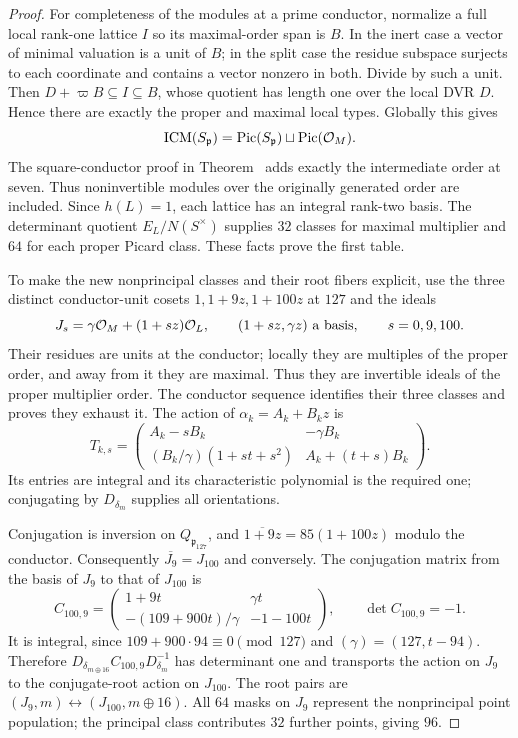 \begin{proof}
For completeness of the modules at a prime conductor, normalize a
full local rank-one lattice $I$ so its maximal-order span is $B$.
In the inert case a vector of minimal valuation is a unit of $B$;
in the split case the residue subspace surjects to each coordinate
and contains a vector nonzero in both.  Divide by such a unit.
Then $D+\varpi B\subseteq I\subseteq B$, whose quotient has length
one over the local DVR $D$.  Hence there are exactly the proper
and maximal local types.  Globally this gives
\[
 \operatorname{ICM}(S_{\mathfrak p})=
 \operatorname{Pic}(S_{\mathfrak p})\sqcup\operatorname{Pic}(\mathcal O_M).
\]
The square-conductor proof in Theorem~ adds
exactly the intermediate order at seven.  Thus noninvertible modules
over the originally generated order are included.  Since $h(L)=1$,
each lattice has an integral rank-two basis.  The determinant quotient
$E_L/N(S^{\times})$ supplies $32$ classes for maximal multiplier
and $64$ for each proper Picard class.  These facts prove the first table.

To make the new nonprincipal classes and their root fibers explicit,
use the three distinct conductor-unit cosets
$1,1+9z,1+100z$ at $127$ and the ideals
\[
 J_s=\gamma\mathcal O_M+(1+sz)\mathcal O_L,
 \qquad (1+sz,\gamma z)\text{ a basis},\qquad s=0,9,100.
\]
Their residues are units at the conductor; locally they are multiples
of the proper order, and away from it they are maximal.  Thus they
are invertible ideals of the proper multiplier order.  The conductor
sequence identifies their three classes and proves they exhaust it.
The action of $\alpha_k=A_k+B_kz$ is
\[
 T_{k,s}=\begin{pmatrix}
 A_k-sB_k&-\gamma B_k\\
 (B_k/\gamma)(1+st+s^2)&A_k+(t+s)B_k
 \end{pmatrix}.
\]
Its entries are integral and its characteristic polynomial is the
required one; conjugating by $D_{\delta_m}$ supplies all orientations.

Conjugation is inversion on $Q_{\mathfrak p_{127}}$, and
$\overline{1+9z}=85(1+100z)$ modulo the conductor.
Consequently $\overline{J_9}=J_{100}$ and conversely.
The conjugation matrix from the basis of $J_9$ to that of $J_{100}$ is
\[
 C_{100,9}=\begin{pmatrix}
 1+9t&\gamma t\\
 -(109+900t)/\gamma&-1-100t
 \end{pmatrix},\qquad \det C_{100,9}=-1.
\]
It is integral, since $109+900\cdot94\equiv0\pmod{127}$ and
$(\gamma)=(127,t-94)$.  Therefore
$D_{\delta_{m\oplus16}}C_{100,9}D_{\delta_m}^{-1}$ has determinant
one and transports the action on $J_9$ to the conjugate-root action
on $J_{100}$.  The root pairs are
$(J_9,m)\leftrightarrow(J_{100},m\oplus16)$.
All $64$ masks on $J_9$ represent the nonprincipal point population;
the principal class contributes $32$ further points, giving $96$.


\end{proof}
